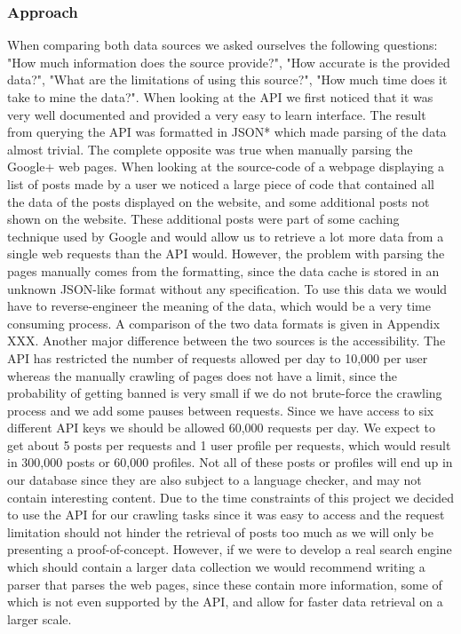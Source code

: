 \subsubsection*{Approach}
When comparing both data sources we asked ourselves the following questions: "How much information does the source provide?", "How accurate is the provided data?", "What are the limitations of using this source?", "How much time does it take to mine the data?". When looking at the API we first noticed that it was very well documented and provided a very easy to learn interface. The result from querying the API was formatted in JSON* which made parsing of the data almost trivial. The complete opposite was true when manually parsing the Google+ web pages. When looking at the source-code of a webpage displaying a list of posts made by a user we noticed a large piece of code that contained all the data of the posts displayed on the website, and some additional posts not shown on the website. These additional posts were part of some caching technique used by Google and would allow us to retrieve a lot more data from a single web requests than the API would. However, the problem with parsing the pages manually comes from the formatting, since the data cache is stored in an unknown JSON-like format without any specification. To use this data we would have to reverse-engineer the meaning of the data, which would be a very time consuming process. A comparison of the two data formats is given in Appendix XXX. 
Another major difference between the two sources is the accessibility. The API has restricted the number of requests allowed per day to 10,000 per user whereas the manually crawling of pages does not have a limit, since the probability of getting banned is very small if we do not brute-force the crawling process and we add some pauses between requests. Since we have access to six different API keys we should be allowed 60,000 requests per day. We expect to get about 5 posts per requests and 1 user profile per requests, which would result in 300,000 posts or 60,000 profiles. Not all of these posts or profiles will end up in our database since they are also subject to a language checker, and may not contain interesting content.
Due to the time constraints of this project we decided to use the API for our crawling tasks since it was easy to access and the request limitation should not hinder the retrieval of posts too much as we will only be presenting a proof-of-concept. However, if we were to develop a real search engine which should contain a larger data collection we would recommend writing a parser that parses the web pages, since these contain more information, some of which is not even supported by the API, and allow for faster data retrieval on a larger scale.

